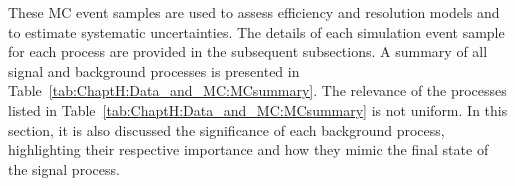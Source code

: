 These MC event samples are used to assess efficiency and resolution models and to estimate 
systematic uncertainties. The details of each simulation event sample for each process 
are provided in the subsequent subsections.
 A summary of all \tHq signal and background processes 
is presented in Table~\ref{tab:ChaptH:Data_and_MC:MCsummary}. 
The relevance of the processes 
listed in Table~\ref{tab:ChaptH:Data_and_MC:MCsummary} is not uniform.
In this section, it is also discussed the significance of each background process, highlighting 
their respective importance and how they mimic the final state of the signal process. %





